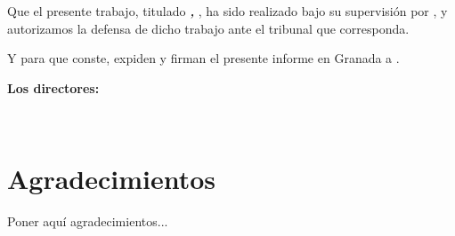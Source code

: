 Que el presente trabajo, titulado \textit{\textbf{\myTitle, \mySubtitle}},
ha sido realizado bajo su supervisión por \textbf{\myName}, y autorizamos la defensa de dicho trabajo ante el tribunal
que corresponda.

\vspace{0.5cm}

Y para que conste, expiden y firman el presente informe en Granada a \myTime.

\vspace{1cm}

\textbf{Los directores:}

\vspace{5cm}

\noindent \textbf{\myProf \ \ \ \ \ \myOtherProf}

\chapter*{Agradecimientos}
\thispagestyle{empty}

       \vspace{1cm}


Poner aquí agradecimientos...

